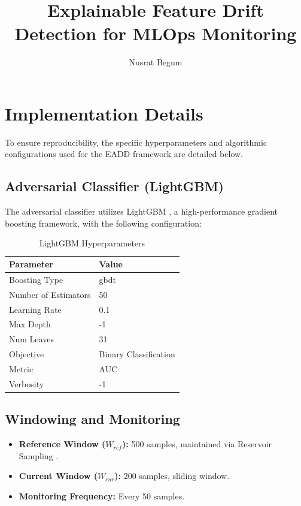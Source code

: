 \documentclass{muthesis2021}
\title{Explainable Feature Drift Detection for MLOps Monitoring}
\author{Nusrat Begum}
\begin{document}
\maketitle




\tableofcontents
\listoftables
\listoffigures

%

\appendix

\chapter{Implementation Details} \label{app:implementation}

To ensure reproducibility, the specific hyperparameters and algorithmic configurations used for the EADD framework are detailed below.

\section{Adversarial Classifier (LightGBM)}
The adversarial classifier utilizes LightGBM \citep{Ke2017}, a high-performance gradient boosting framework, with the following configuration:

\begin{table}[!htbp]
\centering
\caption{LightGBM Hyperparameters}
\begin{tabular}{ll}
\hline
\textbf{Parameter} & \textbf{Value} \\
\hline
Boosting Type & gbdt \\
Number of Estimators & 50 \\
Learning Rate & 0.1 \\
Max Depth & -1 \\
Num Leaves & 31 \\
Objective & Binary Classification \\
Metric & AUC \\
Verbosity & -1 \\
\hline
\end{tabular}
\end{table}

\section{Windowing and Monitoring}
\begin{itemize}
    \item \textbf{Reference Window ($W_{ref}$):} 500 samples, maintained via Reservoir Sampling \citep{Vitter1985}.
    \item \textbf{Current Window ($W_{cur}$):} 200 samples, sliding window.
    \item \textbf{Monitoring Frequency:} Every 50 samples.
\end{itemize}
\end{document}
